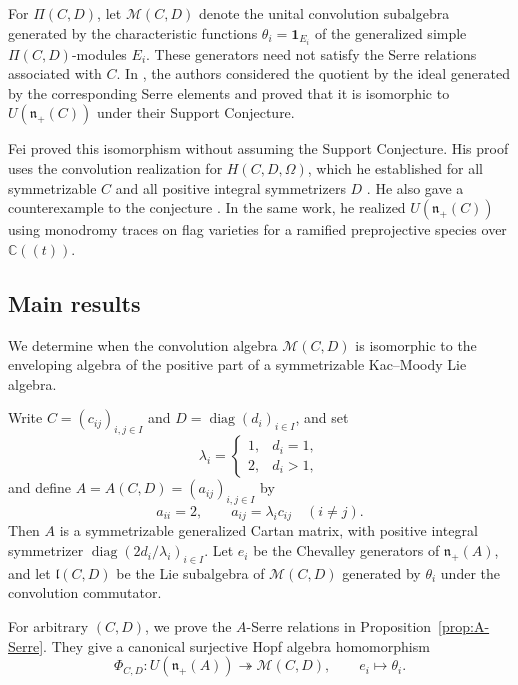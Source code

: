 \documentclass[12pt,reqno]{amsart}
\numberwithin{equation}{section}
\theoremstyle{definition}
\theoremstyle{remark}
\newcommand{\C}{\mathbb C}
\newcommand{\M}{\mathcal M}
\newcommand{\nplus}{\mathfrak n_+}
\newcommand{\diag}{\operatorname{diag}}
\theoremstyle{plain}
\theoremstyle{plain}
\begin{document}

For $\Pi(C,D)$, let $\mathcal M(C,D)$ denote the unital convolution subalgebra generated by the characteristic functions $\theta_i=\mathbf{1}_{E_i}$ of the generalized simple $\Pi(C,D)$-modules $E_i$. These generators need not satisfy the Serre relations associated with $C$. In \cite{GLS18}, the authors considered the quotient by the ideal generated by the corresponding Serre elements and proved that it is isomorphic to $U(\nplus(C))$ under their Support Conjecture.


Fei \cite[Theorem~10.1]{Fei26} proved this isomorphism without assuming the Support Conjecture. His proof uses the convolution realization for $H(C,D,\Omega)$, which he established for all symmetrizable $C$ and all positive integral symmetrizers $D$ \cite[Theorem~A.1]{Fei26}. He also gave a counterexample to the conjecture \cite[Theorem~10.2]{Fei26}. In the same work, he realized $U(\nplus(C))$ using monodromy traces on flag varieties for a ramified preprojective species over $\C((t))$.

\subsection{Main results}
We determine when the convolution algebra $\M(C,D)$ is isomorphic to the enveloping algebra of the positive part of a symmetrizable Kac--Moody Lie algebra.

Write $C=(c_{ij})_{i,j\in I}$ and $D=\diag(d_i)_{i\in I}$, and set
\[
    \lambda_i=
    \begin{cases}
        1, & d_i=1,\\
        2, & d_i>1,
    \end{cases}
\]
and define $A=A(C,D)=(a_{ij})_{i,j\in I}$ by
\[
    a_{ii}=2,\qquad
    a_{ij}=\lambda_i c_{ij}\quad(i\ne j).
\]
Then $A$ is a symmetrizable generalized Cartan matrix, with positive integral symmetrizer $\diag(2d_i/\lambda_i)_{i\in I}$. 
Let $e_i$ be the Chevalley generators of $\nplus (A)$, and let $\mathfrak l(C,D)$ be the Lie subalgebra of $\M(C,D)$ generated by $\theta_i$ under the convolution commutator.

For arbitrary $(C,D)$, we prove the $A$-Serre relations in Proposition~\ref{prop:A-Serre}. 
They give a canonical surjective Hopf algebra homomorphism
\[
    \Phi_{C,D}\colon U(\nplus (A)) \twoheadrightarrow \M(C,D), \qquad e_i\mapsto\theta_i.
\]
\end{document}
